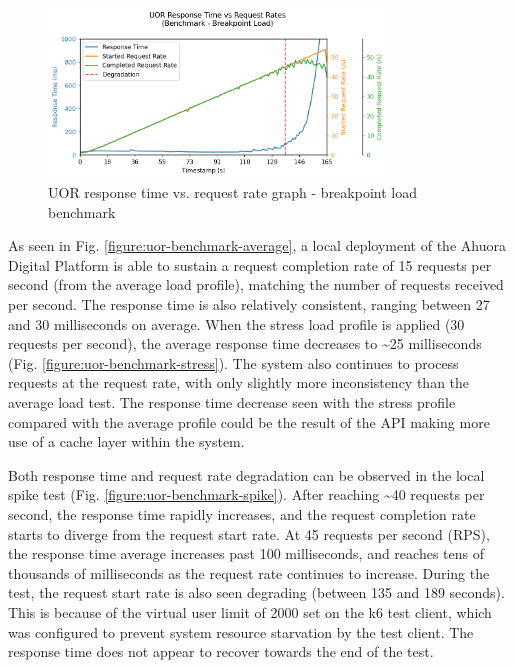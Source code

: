 \begin{figure}[h]
    \centering
    \includegraphics[width=0.8\textwidth]{figures/uor-benchmark-breakpoint.png}
    \caption{UOR response time vs. request rate graph - breakpoint load benchmark}
    \label{figure:uor-benchmark-breakpoint}
\end{figure}

As seen in Fig. \ref{figure:uor-benchmark-average}, a local deployment of the Ahuora Digital Platform is able to sustain a request completion rate of 15 requests per second (from the average load profile), matching the number of requests received per second. The response time is also relatively consistent, ranging between 27 and 30 milliseconds on average. When the stress load profile is applied (30 requests per second), the average response time decreases to \textasciitilde25 milliseconds (Fig. \ref{figure:uor-benchmark-stress}). The system also continues to process requests at the request rate, with only slightly more inconsistency than the average load test. The response time decrease seen with the stress profile compared with the average profile could be the result of the API making more use of a cache layer within the system.

Both response time and request rate degradation can be observed in the local spike test (Fig. \ref{figure:uor-benchmark-spike}). After reaching \textasciitilde40 requests per second, the response time rapidly increases, and the request completion rate starts to diverge from the request start rate. At 45 requests per second (RPS), the response time average increases past 100 milliseconds, and reaches tens of thousands of milliseconds as the request rate continues to increase. During the test, the request start rate is also seen degrading (between 135 and 189 seconds). This is because of the virtual user limit of 2000 set on the k6 test client, which was configured to prevent system resource starvation by the test client. The response time does not appear to recover towards the end of the test.

